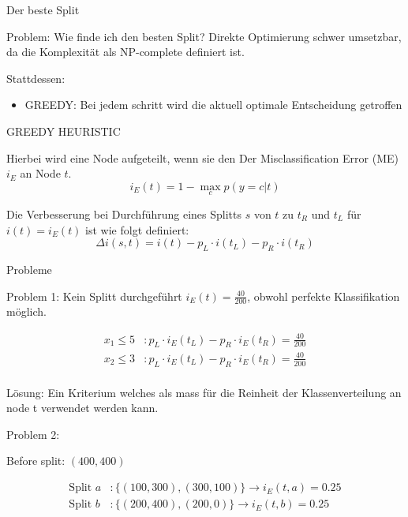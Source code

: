 \documentclass{beamer}
\begin{document}
\begin{frame}{Der beste Split}
\begin{alertblock}{Problem: Wie finde ich den besten Split?}
	Direkte Optimierung schwer umsetzbar, da die Komplexität als NP-complete definiert ist. 		
	
	Stattdessen:
	
	\begin{itemize}
		\item {GREEDY: Bei jedem schritt wird die aktuell optimale Entscheidung getroffen}
	\end{itemize}

\end{alertblock}

\end{frame}


\begin{frame}{GREEDY HEURISTIC}

Hierbei wird eine Node aufgeteilt, wenn sie den Der Misclassification Error (ME) $i_E$ an Node $t$.
   \[
   	i_E (t) = 1 - \max_c p(y = c | t)
   \]

Die Verbesserung bei Durchführung eines Splitts $s$ von $t$ zu $t_R$ und $t_L$ für $i(t) = i_E (t) $ ist wie folgt definiert: 
\[
	\Delta i(s, t) = i(t) - p_L \cdot i(t_L) - p_R \cdot i(t_R)
\]	

\end{frame}

\begin{frame}{Probleme}

Problem 1: Kein Splitt durchgeführt $i_E (t) = \frac{40}{200}$, obwohl perfekte Klassifikation möglich.
  
 \begin{align*}
 	x_1 \leq 5&: p_L \cdot i_E (t_L) - p_R \cdot i_E (t_R) = \frac{40}{200} \\
	x_2 \leq 3&: p_L \cdot i_E (t_L) - p_R \cdot i_E (t_R) = \frac{40}{200} \\
 \end{align*}
 
Lösung: Ein Kriterium welches als mass für die Reinheit der Klassenverteilung an node t verwendet werden kann.

Problem 2:

Before split: $(400, 400)$

 \begin{align*}
 	\text{Split } a &: \{(100,300), (300,100)\} \rightarrow i_E (t, a) = 0.25 \\
	\text{Split } b &: \{(200,400), (200,0)\} \rightarrow i_E (t, b) = 0.25 \\
 \end{align*}
 
\end{frame}
\end{document}
